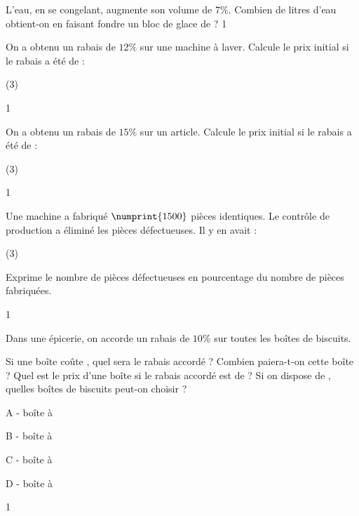 \documentclass[a4paper,11pt]{report}
\begin{document}
\begin{exo}{
L'eau, en se congelant, augmente son volume de $7\%$. Combien de litres d'eau obtient-on en faisant fondre un bloc de glace de  ?
}{1}    
\end{exo}


\begin{exo}{
On a obtenu un rabais de $12\%$ sur une machine à laver. Calcule le prix initial si le rabais a été de :
\begin{tasks}(3)
    \task {}
    \task {}
    \task {}
    \task {}
    \task {}
    \task {}
\end{tasks}
}{1}    
\end{exo}

\begin{exo}{
On a obtenu un rabais de $15\%$ sur un article. Calcule le prix initial si le rabais a été de :
\begin{tasks}(3)
    \task {}
    \task {}
    \task {}
    \task {}
    \task {}
    \task {}
\end{tasks}
}{1}    
\end{exo}

\begin{exo}{
Une machine a fabriqué $\numprint{1500}$ pièces identiques. Le contrôle de production a éliminé les pièces défectueuses. Il y en avait :
\begin{tasks}(3)
\end{tasks}
Exprime le nombre de pièces défectueuses en pourcentage du nombre de pièces fabriquées.
}{1}    
\end{exo}

\begin{exo}{
Dans une épicerie, on accorde un rabais de $10\%$ sur toutes les boîtes de biscuits.
\begin{tasks}
    \task Si une boîte coûte , quel sera le rabais accordé ? Combien paiera-t-on cette boîte ?
    \task Quel est le prix d'une boîte si le rabais accordé est de  ?
    \task Si on dispose de , quelles boîtes de biscuits peut-on choisir ?
    \begin{multicols}{2}
        A - boîte à 

        B - boîte à 

        C - boîte à 

        D - boîte à 
    \end{multicols}
    
\end{tasks}
}{1}    
\end{exo}
\end{document}
